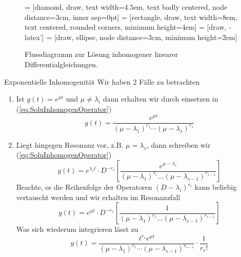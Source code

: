 \begin{figure}[htb]
  \centering
   = [diamond, draw, 
    text width=4.5em, text badly centered, node distance=3cm, inner sep=0pt]
   = [rectangle, draw, 
    text width=8em, text centered, rounded corners, minimum height=4em]
   = [draw, -latex']
   = [draw, ellipse, node distance=3cm,
    minimum height=2em]
\caption{Flussdiagramm zur Lösung inhomogener linearer Differentialgleichungen.}
  \label{fig:FlowchartSolu}
\end{figure}
%
\begin{note}{Exponentielle Inhomogenität}
  Wir haben 2 Fälle zu betrachten
  \begin{enumerate}
    \item Ist $g(t)=e^{\mu t}$ und $\mu\ne\lambda_i$ dann erhalten wir durch
      einsetzen in (\ref{eq:SoluInhomogenOperator}) 
  \[ y(t)=\frac{e^{\mu t}}{(\mu-\lambda_1)^{r_1}
            \cdots(\mu-\lambda_s)^{r_s}}\]
	  \item Liegt hingegen Resonanz vor, z.B.  $\mu=\lambda_s$, dann schreiben wir (\ref{eq:SoluInhomogenOperator})
	    \[y(t)=e^{\lambda_s t}\cdot D^{-r_s}
	    \left[\frac{e^{\mu-\lambda_s}}{(\mu-\lambda_1)^{r_1}\dots(\mu-\lambda_{s-1})^{r_{s-1}}}\right]\]
	    Beachte, es die Reihenfolge der Operatoren $(D-\lambda_i)^{r_i}$
	    kann beliebig vertauscht werden und wir erhalten im Resonanzfall
	    \[y(t)=e^{\mu t}\cdot D^{-r_s}
	      \left[\frac{1}{(\mu-\lambda_1)^{r_1}\dots(\mu-\lambda_{s-1})^{r_{s-1}}}\right]\]
	    Was sich wiederum integrieren lässt zu
	\[ y(t)=\frac{t^{r_s}e^{\mu t}}{(\mu-\lambda_1)^{r_1} \cdots(\mu-\lambda_{s-1})^{r_{s-1}}}
	\cdot\frac{1}{r_s!}\]
  \end{enumerate}
\end{note}
%
